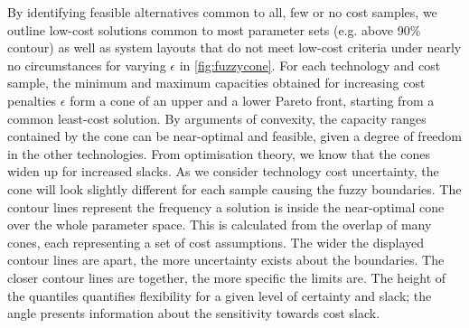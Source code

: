 

By identifying feasible alternatives common to all, few or no cost samples, we
outline low-cost solutions common to most parameter sets (e.g. above 90\%
contour) as well as system layouts that do not meet low-cost criteria under
nearly no circumstances for varying $\epsilon$ in \cref{fig:fuzzycone}. For each
technology and cost sample, the minimum and maximum capacities obtained for
increasing cost penalties $\epsilon$ form a cone of an upper and a lower Pareto
front, starting from a common least-cost solution. By arguments of convexity,
the capacity ranges contained by the cone can be near-optimal and feasible,
given a degree of freedom in the other technologies. From optimisation theory,
we know that the cones widen up for increased slacks. As we consider technology
cost uncertainty, the cone will look slightly different for each sample causing
the fuzzy boundaries. The contour lines represent the frequency a solution is
inside the near-optimal cone over the whole parameter space. This is calculated
from the overlap of many cones, each representing a set of cost assumptions. The
wider the displayed contour lines are apart, the more uncertainty exists about
the boundaries. The closer contour lines are together, the more specific the
limits are. The height of the quantiles quantifies flexibility for a given level
of certainty and slack; the angle presents information about the sensitivity
towards cost slack.

